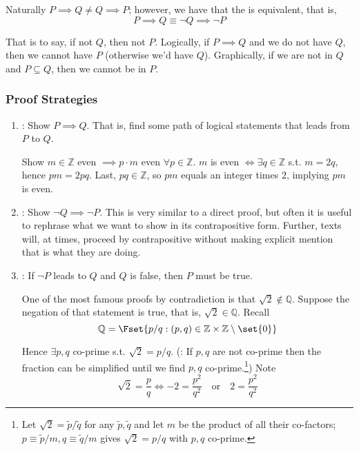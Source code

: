 \documentclass{article}
\begin{document}
Naturally $P \implies Q \ne Q \implies P$; however, we have that the  is equivalent, that is,
\[
  P \implies Q \equiv \neg Q \implies \neg P
\]

That is to say, if not $Q$, then not $P$. Logically, if $P \implies Q$ and we do not have $Q$, then we cannot have $P$ (otherwise we'd have $Q$). Graphically, if we are not in $Q$ and $P \subseteq Q$, then we cannot be in $P$.

\subsubsection{Proof Strategies}
\label{ssub:proof_strategies}

\begin{enumerate}
  \item {}: Show $P \implies Q$. That is, find some path of logical statements that leads from $P$ to $Q$.
    \begin{example}
      Show $m \in \mathbb{Z}$ even $\implies p \cdot m$ even $\forall p \in \mathbb{Z}$. $m$ is even $\iff \exists q \in \mathbb{Z}$ s.t. $m = 2q$, hence $pm = 2pq$. Last, $pq \in \mathbb{Z}$, so $pm$ equals an integer times $2$, implying $pm$ is even.
    \end{example}

  \item {}: Show $\neg Q \implies \neg P$. This is very similar to a direct proof, but often it is useful to rephrase what we want to show in its contrapositive form. Further, texts will, at times, proceed by contrapositive without making explicit mention that is what they are doing.

  \item {}: If $\neg P$ leads to $Q$ and $Q$ is false, then $P$ must be true.
    \begin{example}
      One of the most famous proofs by contradiction is that $\sqrt{2} \notin \mathbb{Q}$. Suppose the negation of that statement is true, that is, $\sqrt{2} \in \mathbb{Q}$. Recall
      \[
        \mathbb{Q} = \Fset{
          p / q: (p, q) \in \mathbb{Z} \times \mathbb{Z}\setminus\set{0}
        }
      \]

      Hence $\exists p, q$ co-prime s.t. $\sqrt{2} = p / q$. (\NB: If $p, q$ are not co-prime then the fraction can be simplified until we find $p, q$ co-prime.\footnote{Let $\sqrt{2} = \widetilde{p} / \widetilde{q}$ for any $\widetilde{p}, \widetilde{q}$ and let $m$ be the product of all their co-factors; $p \equiv \widetilde{p} / m, q \equiv \widetilde{q} / m$ gives $\sqrt{2} = p / q$ with $p, q$ co-prime.}) Note
      \[
        \sqrt{2} = \dfrac{p}{q}
        \iff
        -2 = \dfrac{p^2}{q^2}
        \quad
        \text{or}
        \quad
        2 = \dfrac{p^2}{q^2}
      \]


\end{example}
\end{enumerate}
\end{document}
